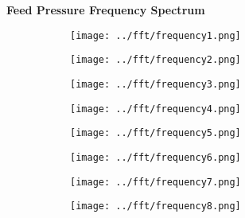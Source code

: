 \documentclass{article}
\begin{document}
    \textbf{Feed Pressure Frequency Spectrum}
    \begin{figure}[H]
        \centering
        \begin{subfigure}{0.48\linewidth}
		    \texttt{[image: ../fft/frequency1.png]}
	    \end{subfigure}
	    \begin{subfigure}{0.48\linewidth}
		    \texttt{[image: ../fft/frequency2.png]}
	    \end{subfigure}
	    \begin{subfigure}{0.48\linewidth}
		    \texttt{[image: ../fft/frequency3.png]}
	    \end{subfigure}
	    \begin{subfigure}{0.48\linewidth}
		    \texttt{[image: ../fft/frequency4.png]}
	    \end{subfigure}
	    \begin{subfigure}{0.48\linewidth}
		    \texttt{[image: ../fft/frequency5.png]}
	    \end{subfigure}
	    \begin{subfigure}{0.48\linewidth}
		    \texttt{[image: ../fft/frequency6.png]}
	    \end{subfigure}
	    \begin{subfigure}{0.48\linewidth}
		    \texttt{[image: ../fft/frequency7.png]}
	    \end{subfigure}
	    \begin{subfigure}{0.48\linewidth}
		    \texttt{[image: ../fft/frequency8.png]}
	    \end{subfigure}
    \end{figure}
    
    \pagebreak
    
\end{document}
